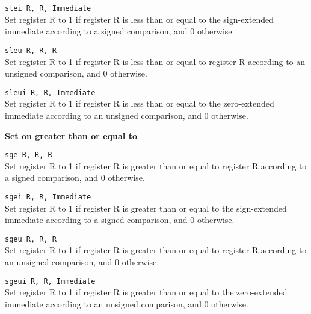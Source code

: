 \documentclass[12pt]{report}
\newcommand\subscr[1]{\raisebox{-0.5ex}{\small #1}}
\newcommand\regs{R\subscr{s}}
\newcommand\regd{R\subscr{d}}
\newcommand\regt{R\subscr{t}}
\begin{document}
\texttt{slei \regd, \regs, Immediate}\\
Set register \regd{} to 1 if register \regs{} is
less than or equal to the sign-extended immediate according to a signed comparison, and 0 otherwise.
\vspace{1ex}

\texttt{sleu \regd, \regs, \regt}\\
Set register \regd{} to 1 if register \regs{} is
less than or equal to register \regt{} according to an unsigned comparison, and 0 otherwise.
\vspace{1ex}

\texttt{sleui \regd, \regs, Immediate}\\
Set register \regd{} to 1 if register \regs{} is
less than or equal to the zero-extended immediate according to an unsigned comparison, and 0 otherwise.
\vspace{1ex}

\noindent
{\bf Set on greater than or equal to}

\texttt{sge \regd, \regs, \regt}\\
Set register \regd{} to 1 if register \regs{} is
greater than or equal to register \regt{} according to a signed comparison, and 0 otherwise.
\vspace{1ex}

\texttt{sgei \regd, \regs, Immediate}\\
Set register \regd{} to 1 if register \regs{} is
greater than or equal to the sign-extended immediate according to a signed comparison, and 0 otherwise.
\vspace{1ex}

\texttt{sgeu \regd, \regs, \regt}\\
Set register \regd{} to 1 if register \regs{} is
greater than or equal to register \regt{} according to an unsigned comparison, and 0 otherwise.
\vspace{1ex}

\texttt{sgeui \regd, \regs, Immediate}\\
Set register \regd{} to 1 if register \regs{} is
greater than or equal to the zero-extended immediate according to an unsigned comparison, and 0 otherwise.
\vspace{1ex}
\end{document}
